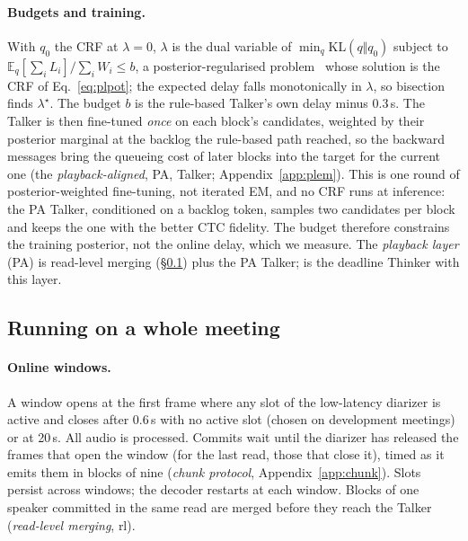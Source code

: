 \paragraph{Budgets and training.} With $q_0$ the CRF at $\lambda=0$, $\lambda$ is the dual
variable of $\min_q\mathrm{KL}(q\Vert q_0)$ subject to $\mathbb{E}_q[\sum_iL_i]/\sum_iW_i\le b$, a posterior-regularised problem~\citep{ganchev2010posterior} whose solution is the CRF of Eq.~\eqref{eq:plpot}; the
expected delay falls monotonically in $\lambda$, so bisection finds $\lambda^\star$. The budget $b$ is the rule-based
Talker's own delay minus 0.3\,s. The Talker is then fine-tuned \emph{once} on each block's candidates, weighted by their
posterior marginal at the backlog the rule-based path reached, so the backward messages bring the queueing cost of
later blocks into the target for the current one (the \emph{playback-aligned}, PA, Talker; Appendix~\ref{app:plem}).
This is one round of posterior-weighted fine-tuning, not iterated EM, and no CRF runs at inference: the PA Talker,
conditioned on a backlog token, samples two candidates per block and keeps the one with the better CTC fidelity. The
budget therefore constrains the training posterior, not the online delay, which we measure. The \emph{playback layer}
(PA) is read-level merging (\S\ref{sec:method-online}) plus the PA Talker; \sys{} is the deadline Thinker with this
layer.

\subsection{Running on a whole meeting}
\label{sec:method-online}

\paragraph{Online windows.} A window opens at the first frame where any slot of the low-latency diarizer is active and
closes after 0.6\,s with no active slot (chosen on development meetings) or at 20\,s. All audio is processed. Commits
wait until the diarizer has released the frames that open the window (for the last read, those that close it), timed
as it emits them in blocks of nine (\emph{chunk protocol}, Appendix~\ref{app:chunk}). Slots persist across windows; the decoder restarts at each window. Blocks of one speaker
committed in the same read are merged before they reach the Talker (\emph{read-level merging}, rl).
